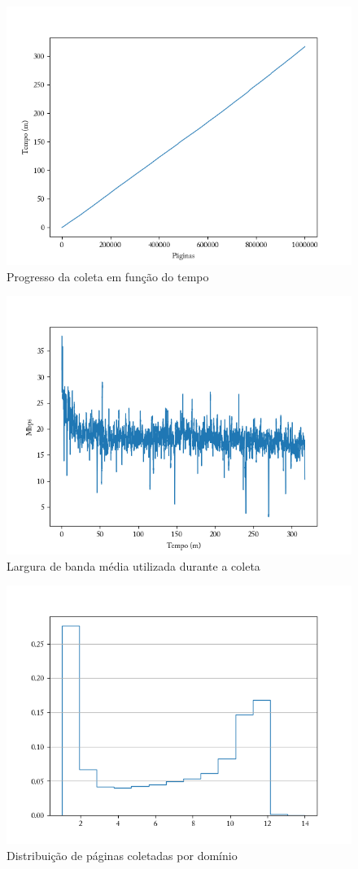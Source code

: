 \documentclass[paper=a4, fontsize=11pt]{scrartcl}
\numberwithin{equation}{section}		%
\numberwithin{figure}{section}			%
\numberwithin{table}{section}				%
\begin{document}
\begin{figure}
  \caption{Progresso da coleta em função do tempo}
  \label{fig:tempo}
  \centering
    \includegraphics[width=1\textwidth]{tempo}
\end{figure}

\begin{figure}
  \caption{Largura de banda média utilizada durante a coleta}
  \label{fig:banda}
  \centering
    \includegraphics[width=1\textwidth]{banda}
\end{figure}


\begin{figure}
  \caption{Distribuição de páginas coletadas por domínio}
  \label{fig:distribuicao}
  \centering
    \includegraphics[width=1\textwidth]{por-dominio}
\end{figure}


\end{document}
